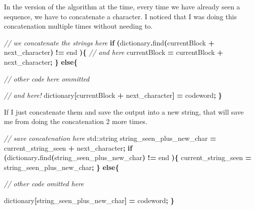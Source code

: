 \documentclass[12pt,twoside]{reedthesis}
\newenvironment{Shaded}{\begin{snugshade}}{\end{snugshade}}
\newcommand{\BuiltInTok}[1]{#1}
\newcommand{\CommentTok}[1]{\textcolor[rgb]{0.56,0.35,0.01}{\textit{#1}}}
\newcommand{\ControlFlowTok}[1]{\textcolor[rgb]{0.13,0.29,0.53}{\textbf{#1}}}
\newcommand{\NormalTok}[1]{#1}
\newcommand{\OperatorTok}[1]{\textcolor[rgb]{0.81,0.36,0.00}{\textbf{#1}}}
\begin{document}
In the version of the algorithm at the time, every time we have already seen a sequence, we have to concatenate a character. I noticed that I was doing this concatenation multiple times without needing to.
\begin{Shaded}
\begin{Highlighting}[]
        \CommentTok{// we concatenate the strings here}
        \ControlFlowTok{if} \OperatorTok{(}\NormalTok{dictionary}\OperatorTok{.}\NormalTok{find}\OperatorTok{(}\NormalTok{currentBlock }\OperatorTok{+}\NormalTok{ next\_character}\OperatorTok{)} \OperatorTok{!=}\NormalTok{ end }\OperatorTok{)\{}
            \CommentTok{// and here}
\NormalTok{            currentBlock }\OperatorTok{=}\NormalTok{ currentBlock }\OperatorTok{+}\NormalTok{ next\_character}\OperatorTok{;}
        \OperatorTok{\}}
        \ControlFlowTok{else}\OperatorTok{\{}

            \CommentTok{// other code here ommitted}


            \CommentTok{// and here! }
\NormalTok{            dictionary}\OperatorTok{[}\NormalTok{currentBlock }\OperatorTok{+}\NormalTok{ next\_character}\OperatorTok{]} \OperatorTok{=}\NormalTok{ codeword}\OperatorTok{;}
        \OperatorTok{\}}
\end{Highlighting}
\end{Shaded}
If I just concatenate them and save the output into a new string, that will save me from doing the concatenation 2 more times.
\begin{Shaded}
\begin{Highlighting}[]
    \CommentTok{// save concatenation here}
      \BuiltInTok{std::}\NormalTok{string}\OperatorTok{ }\NormalTok{string\_seen\_plus\_new\_char }\OperatorTok{=}\NormalTok{ current\_string\_seen }\OperatorTok{+}\NormalTok{ next\_character}\OperatorTok{;}
        \ControlFlowTok{if} \OperatorTok{(}\NormalTok{dictionary}\OperatorTok{.}\NormalTok{find}\OperatorTok{(}\NormalTok{string\_seen\_plus\_new\_char}\OperatorTok{)} \OperatorTok{!=}\NormalTok{ end }\OperatorTok{)\{}
\NormalTok{            current\_string\_seen }\OperatorTok{=}\NormalTok{ string\_seen\_plus\_new\_char}\OperatorTok{;}
        \OperatorTok{\}}
        \ControlFlowTok{else}\OperatorTok{\{}

    \CommentTok{// other code omitted here}

\NormalTok{            dictionary}\OperatorTok{[}\NormalTok{string\_seen\_plus\_new\_char}\OperatorTok{]} \OperatorTok{=}\NormalTok{ codeword}\OperatorTok{;}
        \OperatorTok{\}}
\end{Highlighting}
\end{Shaded}
\end{document}
